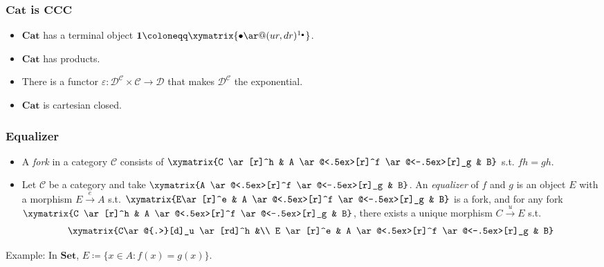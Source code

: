 \documentclass[UTF8,aspectratio=43,11pt,colorlinks,compress,openany]{beamer}%
\begin{document}
\begin{frame}\frametitle{$\mathbf{Cat}$ is $\mathbf{CCC}$}
\begin{itemize}
	\item $\mathbf{Cat}$ has a terminal object $\mathbf{1}\coloneqq \xymatrix{\bullet\ar@(ur,dr)^{1_\bullet}}$.
	\item $\mathbf{Cat}$ has products.
	\item There is a functor $\varepsilon: \mathcal{D}^{\mathcal{C}}\times\mathcal{C}\to\mathcal{D}$ that makes $\mathcal{D}^{\mathcal{C}}$ the exponential.
	\item $\mathbf{Cat}$ is cartesian closed.
\end{itemize}
\end{frame}

\begin{frame}\frametitle{Equalizer}
\setlength\abovedisplayskip{0pt}
\setlength\belowdisplayskip{0pt}
\begin{itemize}
	\item A \emph{fork} in a category $\mathcal{C}$ consists of $\xymatrix{C \ar[r]^h & A \ar@<.5ex>[r]^f \ar@<-.5ex>[r]_g & B}$ s.t. $fh=gh$.
	\item Let $\mathcal{C}$ be a category and take $\xymatrix{A \ar@<.5ex>[r]^f \ar@<-.5ex>[r]_g & B}$. An \emph{equalizer} of $f$ and $g$ is an object $E$ with a morphism $E\xrightarrow{e} A$ s.t. $\xymatrix{E\ar[r]^e & A \ar@<.5ex>[r]^f \ar@<-.5ex>[r]_g & B}$ is a fork, and for any fork $\xymatrix{C \ar[r]^h & A \ar@<.5ex>[r]^f \ar@<-.5ex>[r]_g & B}$, there exists a unique morphism $C\xrightarrow{u} E$ s.t. 
\[
\begin{array}{c}
\xymatrix{C\ar@{.>}[d]_u \ar[rd]^h &\\
E \ar[r]^e & A \ar@<.5ex>[r]^f \ar@<-.5ex>[r]_g & B}
\end{array}
\]
\end{itemize}
Example: In $\mathbf{Set}$, $E\coloneqq \{x\in A: f(x)=g(x)\}$.
\end{frame}
\end{document}
